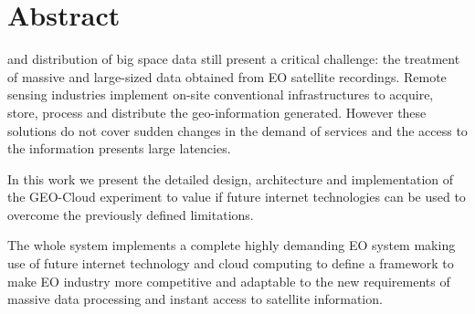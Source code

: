\chapter{Abstract}

 and distribution of big space data still present a critical
challenge: the treatment of massive and large-sized data obtained from \acf{EO}
satellite recordings. Remote sensing industries implement on-site conventional
infrastructures to acquire, store, process and distribute the geo-information
generated. However these solutions do not cover sudden changes in the demand of
services and the access to the information presents large latencies.


In this work we present the detailed design, architecture and implementation of
the GEO-Cloud experiment to value if future internet technologies can be used to
overcome the previously defined limitations.



The whole system implements a complete highly demanding \acs{EO} system making use of future internet technology and cloud computing to define a framework to make \acs{EO} industry more competitive and adaptable to the new requirements of massive data processing and instant access to satellite information.


